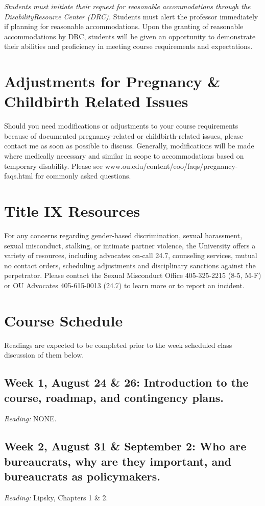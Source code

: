 \documentclass[a4paper,12pt]{article}
\begin{document}
\emph{Students must initiate their request for reasonable accommodations through the DisabilityResource Center (DRC).} Students must alert the professor immediately if planning for reasonable accommodations. Upon the granting of reasonable accommodations by DRC, students will be given an opportunity to demonstrate their abilities and proficiency in meeting course requirements and expectations.

\section*{Adjustments for Pregnancy \& Childbirth Related Issues}

Should you need modifications or adjustments to your course requirements because of documented pregnancy-related or childbirth-related issues, please contact me as soon as possible to discuss.  Generally, modifications will be made where medically necessary and similar in scope to accommodations based on temporary disability.  Please see www.ou.edu/content/eoo/faqs/pregnancy-faqs.html for commonly asked questions.

\section*{Title IX Resources}
For any concerns regarding gender-based discrimination, sexual harassment, sexual misconduct, stalking, or intimate partner violence, the University offers a variety of resources, including advocates on-call 24.7, counseling services, mutual no contact orders, scheduling adjustments and disciplinary sanctions against the perpetrator.  Please contact the Sexual Misconduct Office 405-325-2215 (8-5, M-F) or OU Advocates 405-615-0013 (24.7) to learn more or to report an incident.

\section*{Course Schedule}

Readings are expected to be completed prior to the week scheduled class discussion of them below.

\subsection*{Week 1, August 24 \& 26: Introduction to the course, roadmap, and contingency plans.}
\emph{Reading:} NONE.

\subsection*{Week 2, August 31 \& September 2: Who are bureaucrats, why are they important, and bureaucrats as policymakers.}
\emph{Reading:} Lipsky, Chapters 1 \& 2.
\end{document}
